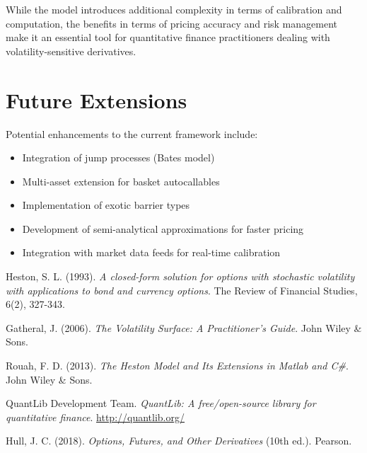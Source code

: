\documentclass[12pt,a4paper]{article}
\begin{document}
While the model introduces additional complexity in terms of calibration and computation, the benefits in terms of pricing accuracy and risk management make it an essential tool for quantitative finance practitioners dealing with volatility-sensitive derivatives.

\section{Future Extensions}

Potential enhancements to the current framework include:

\begin{itemize}
    \item Integration of jump processes (Bates model)
    \item Multi-asset extension for basket autocallables
    \item Implementation of exotic barrier types
    \item Development of semi-analytical approximations for faster pricing
    \item Integration with market data feeds for real-time calibration
\end{itemize}

\begin{thebibliography}{9}

Heston, S. L. (1993). 
\textit{A closed-form solution for options with stochastic volatility with applications to bond and currency options}.
The Review of Financial Studies, 6(2), 327-343.

Gatheral, J. (2006).
\textit{The Volatility Surface: A Practitioner's Guide}.
John Wiley \& Sons.

Rouah, F. D. (2013).
\textit{The Heston Model and Its Extensions in Matlab and C\#}.
John Wiley \& Sons.

QuantLib Development Team.
\textit{QuantLib: A free/open-source library for quantitative finance}.
\url{http://quantlib.org/}

Hull, J. C. (2018).
\textit{Options, Futures, and Other Derivatives} (10th ed.).
Pearson.

\end{thebibliography}
\end{document}

